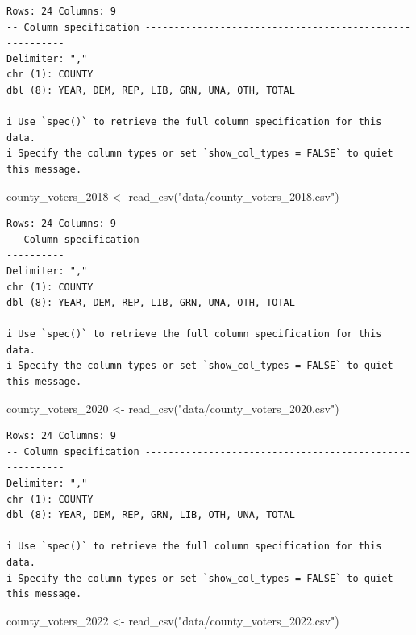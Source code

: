 \documentclass[
  letterpaper,
  DIV=11,
  numbers=noendperiod]{scrreprt}
\newenvironment{Shaded}{\begin{snugshade}}{\end{snugshade}}
\newcommand{\FunctionTok}[1]{\textcolor[rgb]{0.28,0.35,0.67}{#1}}
\newcommand{\NormalTok}[1]{\textcolor[rgb]{0.00,0.23,0.31}{#1}}
\newcommand{\OtherTok}[1]{\textcolor[rgb]{0.00,0.23,0.31}{#1}}
\newcommand{\StringTok}[1]{\textcolor[rgb]{0.13,0.47,0.30}{#1}}
\begin{document}
\begin{verbatim}
Rows: 24 Columns: 9
-- Column specification --------------------------------------------------------
Delimiter: ","
chr (1): COUNTY
dbl (8): YEAR, DEM, REP, LIB, GRN, UNA, OTH, TOTAL

i Use `spec()` to retrieve the full column specification for this data.
i Specify the column types or set `show_col_types = FALSE` to quiet this message.
\end{verbatim}

\begin{Shaded}
\begin{Highlighting}[]
\NormalTok{county\_voters\_2018 }\OtherTok{\textless{}{-}} \FunctionTok{read\_csv}\NormalTok{(}\StringTok{"data/county\_voters\_2018.csv"}\NormalTok{)}
\end{Highlighting}
\end{Shaded}

\begin{verbatim}
Rows: 24 Columns: 9
-- Column specification --------------------------------------------------------
Delimiter: ","
chr (1): COUNTY
dbl (8): YEAR, DEM, REP, LIB, GRN, UNA, OTH, TOTAL

i Use `spec()` to retrieve the full column specification for this data.
i Specify the column types or set `show_col_types = FALSE` to quiet this message.
\end{verbatim}

\begin{Shaded}
\begin{Highlighting}[]
\NormalTok{county\_voters\_2020 }\OtherTok{\textless{}{-}} \FunctionTok{read\_csv}\NormalTok{(}\StringTok{"data/county\_voters\_2020.csv"}\NormalTok{)}
\end{Highlighting}
\end{Shaded}

\begin{verbatim}
Rows: 24 Columns: 9
-- Column specification --------------------------------------------------------
Delimiter: ","
chr (1): COUNTY
dbl (8): YEAR, DEM, REP, GRN, LIB, OTH, UNA, TOTAL

i Use `spec()` to retrieve the full column specification for this data.
i Specify the column types or set `show_col_types = FALSE` to quiet this message.
\end{verbatim}

\begin{Shaded}
\begin{Highlighting}[]
\NormalTok{county\_voters\_2022 }\OtherTok{\textless{}{-}} \FunctionTok{read\_csv}\NormalTok{(}\StringTok{"data/county\_voters\_2022.csv"}\NormalTok{)}
\end{Highlighting}
\end{Shaded}
\end{document}
